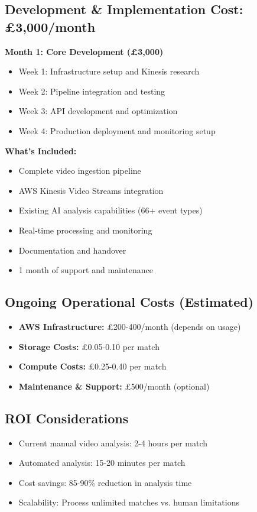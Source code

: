 \documentclass[11pt,a4paper]{article}
\begin{document}
\subsection{Development \& Implementation Cost: £3,000/month}

\textbf{Month 1: Core Development (£3,000)}
\begin{itemize}[leftmargin=1.5cm]
    \item Week 1: Infrastructure setup and Kinesis research
    \item Week 2: Pipeline integration and testing
    \item Week 3: API development and optimization
    \item Week 4: Production deployment and monitoring setup
\end{itemize}

\textbf{What's Included:}
\begin{itemize}[leftmargin=1.5cm]
    \item Complete video ingestion pipeline
    \item AWS Kinesis Video Streams integration
    \item Existing AI analysis capabilities (66+ event types)
    \item Real-time processing and monitoring
    \item Documentation and handover
    \item 1 month of support and maintenance
\end{itemize}

\subsection{Ongoing Operational Costs (Estimated)}
\begin{itemize}[leftmargin=1.5cm]
    \item \textbf{AWS Infrastructure:} £200-400/month (depends on usage)
    \item \textbf{Storage Costs:} £0.05-0.10 per match
    \item \textbf{Compute Costs:} £0.25-0.40 per match
    \item \textbf{Maintenance \& Support:} £500/month (optional)
\end{itemize}

\subsection{ROI Considerations}
\begin{itemize}[leftmargin=1.5cm]
    \item Current manual video analysis: 2-4 hours per match
    \item Automated analysis: 15-20 minutes per match
    \item Cost savings: 85-90\% reduction in analysis time
    \item Scalability: Process unlimited matches vs. human limitations
\end{itemize}
\end{document}
